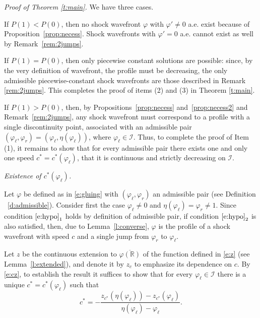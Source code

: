 \documentclass[11pt,a4paper]{article}
\renewcommand{\phi}{\varphi}
\newenvironment{proofof}[1]{\smallskip\noindent\emph{Proof of #1.}%
\hspace{1pt}}{\hspace{-5pt}{\nobreak\quad\nobreak\hfill\nobreak%
$\square$\vspace{8pt}\par}\smallskip\goodbreak}
\begin{document}
\begin{proofof}{Theorem \ref{t:main}}
We have three cases.

If $P(1)<P(0)$, then no shock wavefront $\phi$ with $\phi'\ne0$ a.e. exist because of Proposition~\ref{prop:necess}. Shock wavefronts with $\phi'=0$ a.e. cannot exist as well by Remark~\ref{rem:2jumps}.


If $P(1)=P(0)$, then only piecewise constant solutions are possible:  
since, by the very definition of wavefront, the profile must be decreasing, the only admissible piecewise-constant shock wavefronts are those described in Remark \ref{rem:2jumps}.  This completes the proof of items (2) and (3) in Theorem \ref{t:main}.

If $P(1)>P(0)$, then, by Propositions~\ref{prop:necess} and~\ref{prop:necess2} and Remark~\ref{rem:2jumps}, any shock wavefront must correspond to a profile with a single discontinuity point, associated with an admissible pair $(\varphi_\ell, \varphi_r)=\left(\varphi_\ell, \eta(\varphi_\ell)\right)$, where $\varphi_\ell \in \mathcal I$.  
Thus, to complete the proof of Item (1), it remains to show that for every admissible pair there exists one and only one speed $c^*=c^*(\varphi_\ell)$, that it is continuous and strictly decreasing on $\mathcal I$. 

\medskip
\emph{Existence of $c^*(\varphi_\ell)$.}
%

\noindent Let $\phi$ be defined as in \eqref{e:gluing} with $(\phi_{\ell}, \phi_r)$ an admissible pair (see Definition ~\ref{d:admissible}). Consider first the case $\varphi_\ell \neq 0$ and  $\eta(\varphi_\ell)=\phi_r\neq 1$.  
Since condition $\eqref{e:hypo}_1$ holds by definition of admissible pair, if condition $\eqref{e:hypo}_2$ is also satisfied, then, due to Lemma~\ref{l:converse}, $\varphi$ is the profile of a shock wavefront with speed $c$ and a single jump from $\varphi_r $ to $\varphi_\ell$.

Let $z$ be the continuous extension to $\overline{\varphi(\mathbb R)}$ of the function defined in \eqref{e:z} (see Lemma~\ref{l:extended}), and denote it by $z_c$ to emphasize its dependence on $c$.  
By \eqref{e:cz}, to establish the result it suffices to show that for every $\varphi_\ell \in \mathcal I$ there is a unique $c^*=c^*(\phi_\ell)$ such that
\begin{equation}
\label{e:constraint_z}
c^* = -\frac{z_{c^*}\left(\eta(\varphi_\ell)\right) - z_{c^*}(\varphi_\ell)}{\eta(\varphi_\ell) - \varphi_\ell}.
\end{equation}


\end{proofof}
\end{document}
